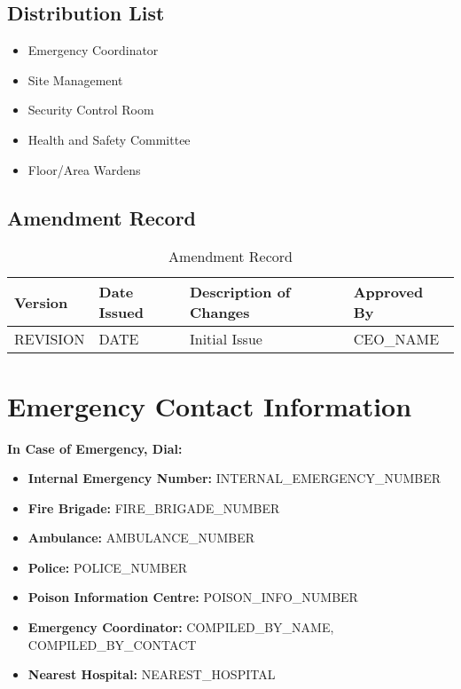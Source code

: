 \documentclass[11pt]{article}
\newcommand{\issueDate}{{{DATE}}}
\newcommand{\compilerName}{{{COMPILED_BY_NAME}}}
\newcommand{\compilerPhone}{{{COMPILED_BY_CONTACT}}}
\newcommand{\revision}{{{REVISION}}}
\begin{document}
\subsection{Distribution List}
\begin{itemize}
    \item Emergency Coordinator
    \item Site Management
    \item Security Control Room
    \item Health and Safety Committee
    \item Floor/Area Wardens
\end{itemize}

\subsection{Amendment Record}
\begin{table}[h]
    \centering
    \begin{tabular}{p{2cm}p{3cm}p{6cm}p{3cm}}
        \toprule
        \textbf{Version} & \textbf{Date Issued} & \textbf{Description of Changes} & \textbf{Approved By} \\
        \midrule
        \revision & \issueDate & Initial Issue & {{CEO_NAME}} \\
        \bottomrule
    \end{tabular}
    \caption{Amendment Record}
\end{table}

\section{Emergency Contact Information}
\textbf{In Case of Emergency, Dial:}
\begin{itemize}
    \item \textbf{Internal Emergency Number:} {{INTERNAL_EMERGENCY_NUMBER}}
    \item \textbf{Fire Brigade:} {{FIRE_BRIGADE_NUMBER}}
    \item \textbf{Ambulance:} {{AMBULANCE_NUMBER}}
    \item \textbf{Police:} {{POLICE_NUMBER}}
    \item \textbf{Poison Information Centre:} {{POISON_INFO_NUMBER}}
    \item \textbf{Emergency Coordinator:} \compilerName, \compilerPhone
    \item \textbf{Nearest Hospital:} {{NEAREST_HOSPITAL}}
\end{itemize}
\end{document}
